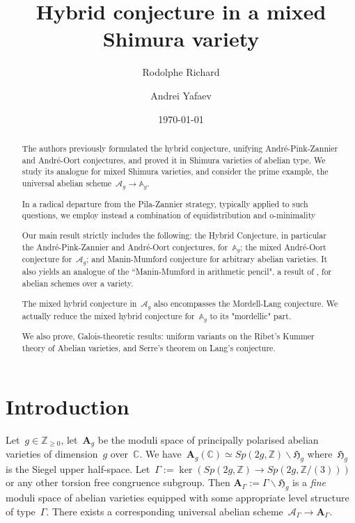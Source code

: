 \documentclass[12pt]{amsart}
\title[Hybrid conjecture in a mixed Shimura variety]{Hybrid conjecture in a mixed Shimura variety}
\author{Rodolphe Richard}
\author{Andrei Yafaev}
\date{\today}
\newcommand{\Z}{{\mathbb Z}}
\newcommand{\C}{{\mathbb C}}
\begin{document}
\setcounter{tocdepth}{1}
\setcounter{secnumdepth}{4}
\maketitle

\begin{abstract}The authors previously formulated the hybrid conjecture, unifying  André-Pink-Zannier and André-Oort conjectures, and proved it in Shimura varieties of abelian type. We study its analogue for mixed Shimura varieties, and consider the prime example, the universal abelian scheme~$\mathcal{A}_g\to \mathbb{A}_g$. 


In a radical departure from the Pila-Zannier strategy, typically applied to such questions, we employ instead a combination of equidistribution and o-minimality

Our main result strictly includes the following:  the Hybrid Conjecture, in particular the André-Pink-Zannier and André-Oort conjectures, for~$\mathbb{A}_g$; the mixed André-Oort conjecture for~$\mathcal{A}_g$; and Manin-Mumford conjecture for arbitrary abelian varieties. It also yields an analogue of the ``Manin-Mumford in arithmetic pencil", a result of \cite{BRU}, for abelian schemes over a variety.

The mixed hybrid conjecture in~$\mathcal{A}_g$ also encompasses the Mordell-Lang conjecture. We actually reduce the mixed hybrid conjecture for~$\mathbb{A}_g$ to its "mordellic" part. 

We also prove, Galois-theoretic results: uniform variants on the Ribet's Kummer theory of Abelian varieties, and Serre's theorem on Lang's conjecture.
\end{abstract}

\tableofcontents

\section{Introduction}

Let~$g\in\Z_{\geq0}$, let~$\mathbf{A}_g$ be the moduli space of principally polarised abelian varieties of dimension~$g$ over~$\C$.
We have~$\mathbf{A}_g(\C)\simeq Sp(2g,\Z)\backslash \mathfrak{H}_g$ where~$\mathfrak{H}_g$ is
 the Siegel upper half-space. Let~$\Gamma:=\ker (Sp(2g,\Z)\to Sp(2g,\Z/(3)))$ or any other torsion free congruence subgroup. Then $\mathbf{A}_\Gamma:=\Gamma\backslash \mathfrak{H}_g$ is a \emph{fine}
moduli space of abelian varieties equipped with some appropriate level structure of type~$\Gamma$. There exists a corresponding universal abelian 
scheme~$\mathcal{A}_\Gamma\to  \mathbf{A}_\Gamma$. 
\end{document}
